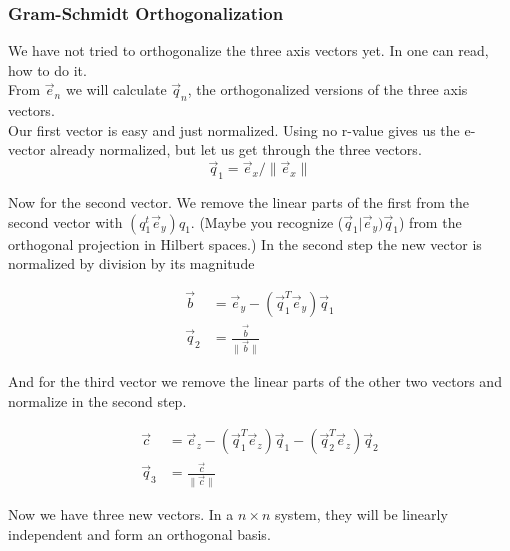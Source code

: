 \documentclass[a4paper]{article}
\begin{document}
\begin{PropositionOpt4}
\subsubsection{Gram-Schmidt Orthogonalization}
\label{gram_schmidt_excercise}
We have not tried to orthogonalize the three axis vectors yet. In \cite{Strang1} one can read, how to do it.\\

From $\vec{e}_{n}$ we will calculate $\vec{q}_{n}$, the orthogonalized versions of the three axis vectors.\\

Our first vector is easy and just normalized. Using no r-value gives us the e-vector already normalized, but let us get through the three vectors.\\

\begin{displaymath}
\vec{q}_1 = \vec{e}_{x}/\|\vec{e}_{x}\|
\end{displaymath}

Now for the second vector. We remove the linear parts of the first from the second vector with $(q_{1}^{t}\vec{e}_{y})q_{1}$. (Maybe you recognize ($\vec{q}_{1}|\vec{e}_{y})\vec{q}_{1}$) from the orthogonal projection in Hilbert spaces.) In the second step the new vector is normalized by division by its magnitude

\begin{displaymath}
\begin{align}
\vec{b} &= \vec{e}_y - (\vec{q}_{1}^{T}\vec{e}_{y})\vec{q}_{1}\\
\vec{q}_{2} &= \frac{\vec{b}}{\|\vec{b}\|}
\end{align}
\end{displaymath}

And for the third vector we remove the linear parts of the other two vectors and normalize in the second step.

\begin{displaymath}
\begin{align}
\vec{c} &= \vec{e}_{z} - (\vec{q}_{1}^{T}\vec{e}_{z})\vec{q}_{1} - (\vec{q}_{2}^{T}\vec{e}_{z})\vec{q}_{2}\\
\vec{q}_{3} &= \frac{\vec{c}}{\|\vec{c}\|}
\end{align}
\end{displaymath}

Now we have three new vectors. In a $n\times n$ system, they will be linearly independent and form an orthogonal basis.\\



\end{PropositionOpt4}
\end{document}
